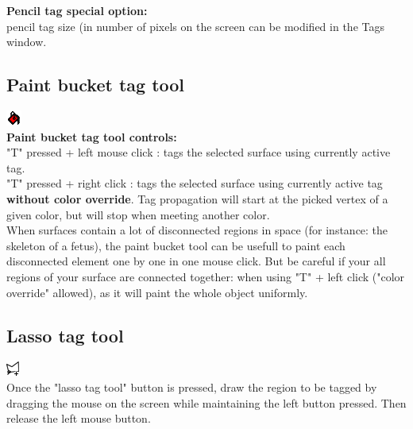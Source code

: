 \textbf{Pencil tag special option:}\\
\noindent
pencil tag size (in number of pixels on the screen can be modified in the Tags window.



\subsection{Paint bucket tag tool}
\includegraphics[scale=0.7]{images/pixmap/Flood_fill.png}\\
\textbf{Paint bucket tag tool controls:}\\
"T" pressed + left mouse click : tags the selected surface using currently active tag.\\
"T" pressed + right click : tags the selected surface using currently active tag \textbf{without color override}. Tag propagation will start at the picked vertex of a given color, but will stop when meeting another color.\\
 
When surfaces contain a lot of disconnected regions in space (for instance: the skeleton of a fetus), the paint bucket tool can be usefull to paint each disconnected element one by one in one mouse click. But be careful if your all regions of your surface are connected together: when using "T" + left click ("color override" allowed), as it will paint the whole object uniformly.

\subsection{Lasso tag tool} \label{lasso_tag_section}
\includegraphics[scale=0.7]{images/pixmap/Lasso_plus.png}\\
Once the "lasso tag tool" button is pressed, draw the region to be tagged by dragging the mouse on the screen while maintaining the left button pressed. Then release the left mouse button. 

